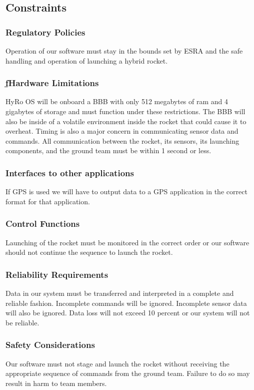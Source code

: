 \documentclass[10pt,draftclsnofoot,onecolumn,compsoc]{IEEEtran}
\begin{document}
\subsection{Constraints}

\subsubsection{\bf  Regulatory Policies}Operation of our software must stay in the bounds set by ESRA and the safe handling and operation of launching a hybrid rocket.  

\subsubsection{\b fHardware Limitations} HyRo OS will be onboard a BBB with only 512 megabytes of ram and 4 gigabytes of storage and must function under these restrictions. The BBB will also be inside of a volatile environment inside the rocket that could cause it to overheat. Timing is also a major concern in communicating sensor data and commands. All communication between the rocket, its sensors, its launching components, and the ground team must be within 1  second or less.

\subsubsection{\bf  Interfaces to other applications} If GPS is used we will have to output data to a GPS application in the correct format for that application.
\subsubsection{\bf Control Functions} Launching of the rocket must be monitored in the correct order or our software should not continue the sequence to launch the rocket.
\subsubsection{\bf Reliability Requirements} Data in our system must be transferred and interpreted in a complete and reliable fashion. Incomplete commands will be ignored. Incomplete sensor data will also be ignored. Data loss will not exceed 10 percent or our system will not be reliable.
\subsubsection{\bf Safety Considerations} Our software must not stage and launch the rocket without receiving the appropriate sequence of commands from the ground team. Failure to do so may result in harm to team members.
\end{document}
